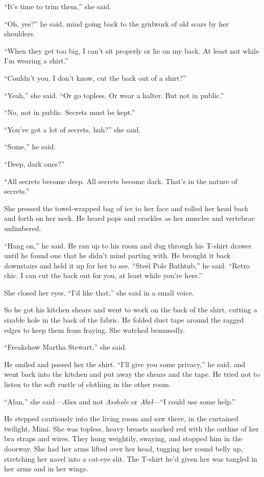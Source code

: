 \documentclass{article}
\begin{document}
``It's time to trim them,'' she said.

``Oh, yes?'' he said, mind going back to the gridwork of old scars by
her shoulders.

``When they get too big, I can't sit properly or lie on my back.  At
least not while I'm wearing a shirt.''

``Couldn't you, I don't know, cut the back out of a shirt?''

``Yeah,'' she said.  ``Or go topless.  Or wear a halter.  But not in
public.''

``No, not in public.  Secrets must be kept.''

``You've got a lot of secrets, huh?'' she said.

``Some,'' he said.

``Deep, dark ones?''

``All secrets become deep.  All secrets become dark.  That's in the
nature of secrets.''

She pressed the towel-wrapped bag of ice to her face and rolled her
head back and forth on her neck.  He heard pops and crackles as her
muscles and vertebrae unlimbered.

``Hang on,'' he said.  He ran up to his room and dug through his
T-shirt drawer until he found one that he didn't mind parting with. 
He brought it back downstairs and held it up for her to see.  ``Steel
Pole Bathtub,'' he said.  ``Retro chic.  I can cut the back out for
you, at least while you're here.''

She closed her eyes.  ``I'd like that,'' she said in a small voice.

So he got his kitchen shears and went to work on the back of the
shirt, cutting a sizable hole in the back of the fabric.  He folded
duct tape around the ragged edges to keep them from fraying.  She
watched bemusedly.

``Freakshow Martha Stewart,'' she said.

He smiled and passed her the shirt.  ``I'll give you some privacy,''
he said, and went back into the kitchen and put away the shears and
the tape.  He tried not to listen to the soft rustle of clothing in
the other room.

``Alan,'' she said---\textit{Alan} and not \textit{Asshole} or
\textit{Abel}---``I could use some help.''

He stepped cautiously into the living room and saw there, in the
curtained twilight, Mimi.  She was topless, heavy breasts marked red
with the outline of her bra straps and wires.  They hung weightily,
swaying, and stopped him in the doorway.  She had her arms lifted over
her head, tugging her round belly up, stretching her navel into a
cat-eye slit.  The T-shirt he'd given her was tangled in her arms and
in her wings.
\end{document}
